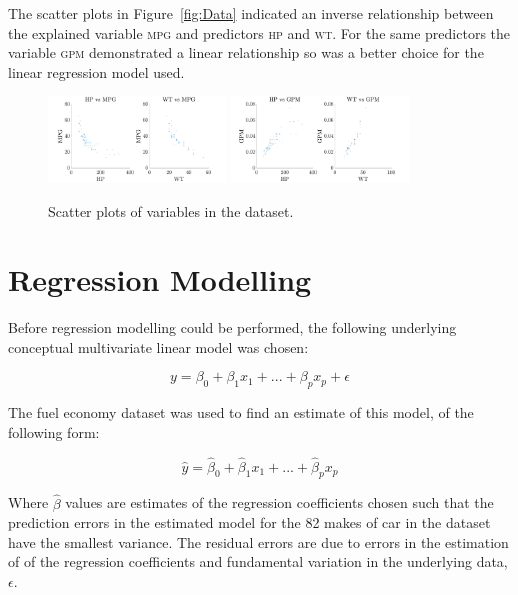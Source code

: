 \documentclass[a4paper,10pt,twocolumn]{article}
\newcommand{\MPG}{\textsc{mpg}\xspace}
\newcommand{\GPM}{\textsc{gpm}\xspace}
\newcommand{\HP}{\textsc{hp}\xspace}
\newcommand{\WT}{\textsc{wt}\xspace}
\begin{document}
The scatter plots in Figure~\vref{fig:Data} indicated an inverse relationship 
between the explained variable \MPG and predictors \HP and \WT. For the same 
predictors the variable \GPM demonstrated a linear relationship so was a better 
choice for the linear regression model used.

\begin{figure}[h]
    \centering
    \includegraphics[width=0.42\textwidth]{MPG}
    \includegraphics[width=0.42\textwidth]{GPM}
    \caption{Scatter plots of variables in the dataset.}
    \label{fig:Data}
\end{figure}

\section{Regression Modelling}

Before regression modelling could be performed, the following underlying 
conceptual multivariate linear model was chosen:

\begin{equation}
    y = \beta_0 + \beta_1 x_1 + ... + \beta_p x_p + \epsilon
    \label{eq:Model}
\end{equation}

The fuel economy dataset was used to find an estimate of this model, of the 
following form:

\begin{equation}
    \hat{y} = \hat{\beta}_0 + \hat{\beta}_1 x_1 + ... + \hat{\beta}_p x_p
    \label{eq:Estimate}
\end{equation}

Where $\hat{\beta}$ values are estimates of the regression coefficients chosen 
such that the prediction errors in the estimated model for the 82 makes of car 
in the dataset have the smallest variance. The residual errors are due to 
errors in the estimation of of the regression coefficients and fundamental 
variation in the underlying data, $\epsilon$.
\end{document}

